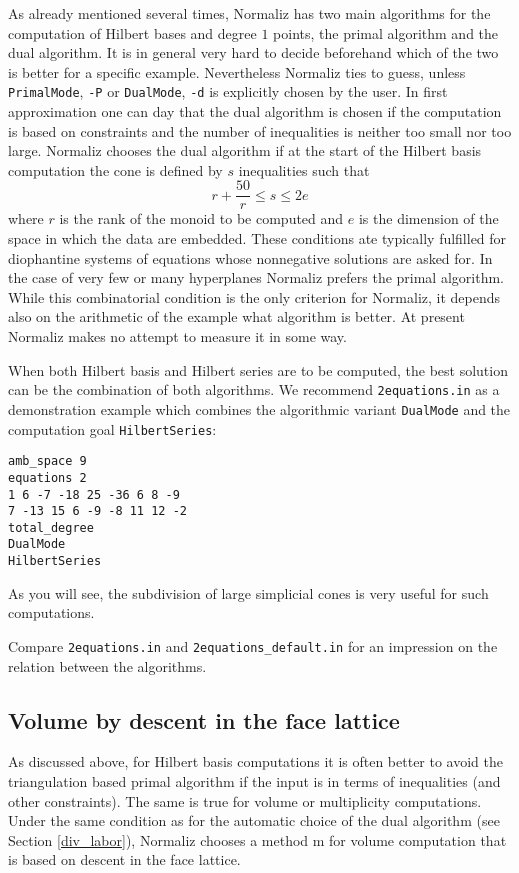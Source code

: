 \documentclass[12pt,a4paper]{scrartcl}
\theoremstyle{definition}
\begin{document}
{As already mentioned several times, Normaliz has two main algorithms for the computation of Hilbert bases and degree $1$ points, the primal algorithm and the dual algorithm. It is in general very hard to decide beforehand which of the two is better for a specific example. Nevertheless Normaliz ties to guess, unless \verb|PrimalMode|, \verb|-P| or \verb|DualMode|, \verb|-d| is explicitly chosen by the user. In first approximation one can day that the dual algorithm is chosen if the computation is based on constraints and the number of inequalities is neither too small nor too large. Normaliz chooses the dual algorithm if at the start of the Hilbert basis computation the cone is defined by $s$ inequalities such that
$$
r+\frac{50}{r} \le s \le 2e
$$
where $r$ is the rank of the monoid to be computed and $e$ is the dimension of the space in which the data are embedded. These conditions ate typically fulfilled for diophantine systems of equations whose nonnegative solutions are asked for. 
In the case of very few or many hyperplanes Normaliz prefers the primal algorithm. While this combinatorial condition is the only criterion for Normaliz, it depends also on the arithmetic of the example what algorithm is better. At present Normaliz makes no attempt to measure it in some way.

When both Hilbert basis and Hilbert series are to be computed, the best solution can be the combination of both algorithms. We recommend \verb|2equations.in| as a demonstration example which combines the algorithmic variant \verb|DualMode| and the computation goal \verb|HilbertSeries|:
\begin{Verbatim}
amb_space 9
equations 2
1 6 -7 -18 25 -36 6 8 -9
7 -13 15 6 -9 -8 11 12 -2
total_degree
DualMode
HilbertSeries
\end{Verbatim}
As you will see, the subdivision of large simplicial cones is very useful for such computations.

Compare \verb|2equations.in| and \verb|2equations_default.in| for an impression on the relation between the algorithms.

\subsection{Volume by descent in the face lattice}\label{descent}

As discussed above, for Hilbert basis computations it is often better to avoid the triangulation based primal algorithm if the input is in terms of inequalities (and other constraints). The same is true for volume or multiplicity computations. Under the same condition as for the automatic choice of the dual algorithm (see Section \ref{div_labor}), Normaliz chooses a method m for volume computation that is based on descent in the face lattice.

}
\end{document}
